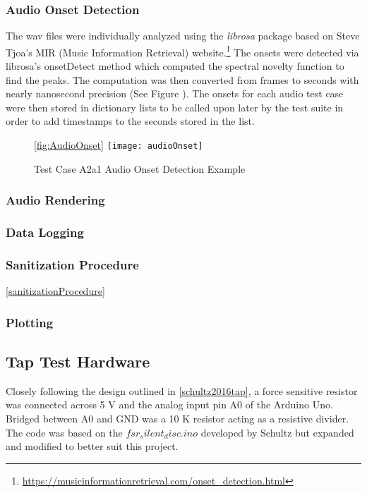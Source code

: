 \subsubsection{Audio Onset Detection}
The wav files were individually analyzed using the \textit{librosa} package based on Steve Tjoa's MIR (Music Information Retrieval) website.\footnote{\url{https://musicinformationretrieval.com/onset_detection.html}}
The onsets were detected via librosa's onsetDetect method which computed the spectral novelty function to find the peaks. The computation was then converted from frames to seconds with nearly nanosecond precision (See Figure \label{fig:AudioOnset}). The onsets for each audio test case were then stored in dictionary lists to be called upon later by the test suite in order to add timestamps to the seconds stored in the list.
\begin{figure}[H]\ref{fig:AudioOnset}
    \centering
    \texttt{[image: audioOnset]}
    \caption{Test Case A2a1 Audio Onset Detection Example}
\end{figure}
\subsubsection{Audio Rendering}

\subsubsection{Data Logging}

\subsubsection{Sanitization Procedure}\ref{sanitizationProcedure}

\subsubsection{Plotting}

\subsection{Tap Test Hardware} \label{tap_arduino}
Closely following the design outlined in \ref{schultz2016tap}, a force sensitive resistor was connected across 5 V and the analog input pin A0 of the Arduino Uno. Bridged between A0 and GND was a 10 K resistor acting as a resistive divider. The code was based on the \textit{$fsr_silent_disc.ino$} developed by Schultz but expanded and modified to better suit this project. 

